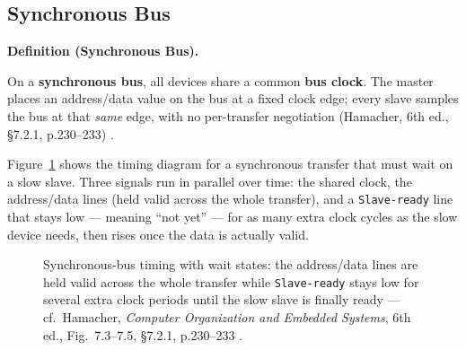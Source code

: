 \documentclass[11pt]{article}
\newenvironment{definitionbox}[1]{%
  \par\noindent\textbf{Definition (#1).}\ \itshape
}{\par\vspace{0.3em}}
\begin{document}
\subsection{Synchronous Bus}

\begin{definitionbox}{Synchronous Bus}
On a \textbf{synchronous bus}, all devices share a common \textbf{bus clock}. The master places an address/data value on the bus at a fixed clock edge; every slave samples the bus at that \emph{same} edge, with no per-transfer negotiation (Hamacher, 6th ed., \S7.2.1, p.230--233) \cite{Hamacher2002_computer_organization}.
\end{definitionbox}

Figure~\ref{fig:sync-bus} shows the timing diagram for a synchronous transfer that must wait on a slow slave. Three signals run in parallel over time: the shared clock, the address/data lines (held valid across the whole transfer), and a \texttt{Slave-ready} line that stays low --- meaning ``not yet'' --- for as many extra clock cycles as the slow device needs, then rises once the data is actually valid.

\begin{figure}[h]
  \centering
  \caption{Synchronous-bus timing with wait states: the address/data lines are held valid across the whole transfer while \texttt{Slave-ready} stays low for several extra clock periods until the slow slave is finally ready --- cf.\ Hamacher, \textit{Computer Organization and Embedded Systems}, 6th ed., Fig.~7.3--7.5, \S7.2.1, p.230--233 \cite{Hamacher2002_computer_organization}.}
  \label{fig:sync-bus}
\end{figure}
\end{document}

